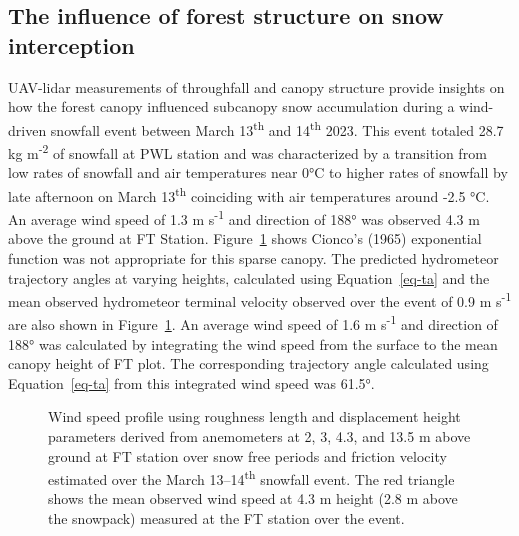 \documentclass[
  letterpaper,
  DIV=11,
  numbers=noendperiod]{scrartcl}
\begin{document}
\subsection{The influence of forest structure on snow
interception}\label{the-influence-of-forest-structure-on-snow-interception}

UAV-lidar measurements of throughfall and canopy structure provide
insights on how the forest canopy influenced subcanopy snow accumulation
during a wind-driven snowfall event between March 13\textsuperscript{th}
and 14\textsuperscript{th} 2023. This event totaled 28.7 kg
m\textsuperscript{-2} of snowfall at PWL station and was characterized
by a transition from low rates of snowfall and air temperatures near 0°C
to higher rates of snowfall by late afternoon on March
13\textsuperscript{th} coinciding with air temperatures around -2.5 °C.
An average wind speed of 1.3 m s\textsuperscript{-1} and direction of
188° was observed 4.3 m above the ground at FT Station.
Figure~\ref{fig-wind-profiles} shows Cionco's (1965) exponential
function was not appropriate for this sparse canopy. The predicted
hydrometeor trajectory angles at varying heights, calculated using
Equation~\ref{eq-ta} and the mean observed hydrometeor terminal velocity
observed over the event of 0.9 m s\textsuperscript{-1} are also shown in
Figure~\ref{fig-wind-profiles}. An average wind speed of 1.6 m
s\textsuperscript{-1} and direction of 188° was calculated by
integrating the wind speed from the surface to the mean canopy height of
FT plot. The corresponding trajectory angle calculated using
Equation~\ref{eq-ta} from this integrated wind speed was 61.5°.

\begin{figure}


\caption{\label{fig-wind-profiles}Wind speed profile using roughness
length and displacement height parameters derived from anemometers at 2,
3, 4.3, and 13.5 m above ground at FT station over snow free periods and
friction velocity estimated over the March 13--14\textsuperscript{th}
snowfall event. The red triangle shows the mean observed wind speed at
4.3 m height (2.8 m above the snowpack) measured at the FT station over
the event.}

\end{figure}%
\end{document}
